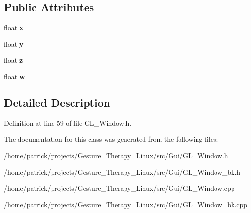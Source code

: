 \subsection*{Public Attributes}
\begin{DoxyCompactItemize}
\item 
\mbox{\label{class_c_quaternion_aa142626d8044752972b87307eef1bc91}} 
float {\bfseries x}
\item 
\mbox{\label{class_c_quaternion_af5b48e463609999097b8f2e8e152be89}} 
float {\bfseries y}
\item 
\mbox{\label{class_c_quaternion_a3e11cd71afc4cc2f085a6b7ff7f07943}} 
float {\bfseries z}
\item 
\mbox{\label{class_c_quaternion_acc55d024df9d954c47fd767dca330e28}} 
float {\bfseries w}
\end{DoxyCompactItemize}


\subsection{Detailed Description}


Definition at line 59 of file G\+L\+\_\+\+Window.\+h.



The documentation for this class was generated from the following files\+:\begin{DoxyCompactItemize}
\item 
/home/patrick/projects/\+Gesture\+\_\+\+Therapy\+\_\+\+Linux/src/\+Gui/G\+L\+\_\+\+Window.\+h\item 
/home/patrick/projects/\+Gesture\+\_\+\+Therapy\+\_\+\+Linux/src/\+Gui/G\+L\+\_\+\+Window\+\_\+bk.\+h\item 
/home/patrick/projects/\+Gesture\+\_\+\+Therapy\+\_\+\+Linux/src/\+Gui/G\+L\+\_\+\+Window.\+cpp\item 
/home/patrick/projects/\+Gesture\+\_\+\+Therapy\+\_\+\+Linux/src/\+Gui/G\+L\+\_\+\+Window\+\_\+bk.\+cpp\end{DoxyCompactItemize}
